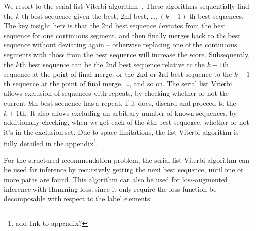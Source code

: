 We resort to the serial list Viterbi algorithm~\cite{seshadri1994list,nilsson2001sequentially}. 
These algorithms sequentially find the $k$-th best sequence given the best, $2$nd best, \dots, $(k-1)$-th best sequences. 
The key insight here is that the 2nd best sequence deviates from the best sequence
for one continuous segment, and then finally merges back to the best sequence without deviating again 
-- otherwise replacing one of the continuous segments with those from the best sequence will increase the score. 
Subsequently, the $k$th best sequence can be the 2nd best sequence relative to the $k-1$th sequence 
at the point of final merge, or the 2nd or 3rd best sequence to the $k-1$th sequence at the point of final merge, \ldots, and so on. 
The serial list Viterbi allows exclusion of sequences with repeats, by checking whether or not the current $k$th best sequence has a repeat, if it does, discard and proceed to the $k+1$th. It also allows excluding an arbitrary number of known sequences, by additionally checking, when we get each of the $k$th best sequence, whether or not it's in the exclusion set. 
Due to space limitations, the list Viterbi algorithm is fully detailed in the appendix\footnote{add link to appendix? }. 

For the structured recommendation problem, the serial list Viterbi algorithm can be used for inference 
by recursively getting the next best sequence, until one or more paths are found. 
This algorithm can also be used for loss-augmented inference with Hamming loss, 
since it only require the loss function be decomposable with respect to the label elements. 

